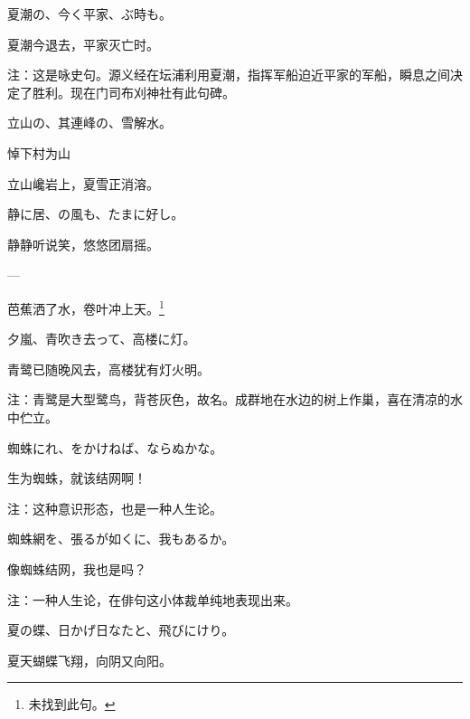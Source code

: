 \begin{haiku}
    {\FH 夏潮の、今く平家、ぶ時も。}

    {\FK 夏潮今退去，平家灭亡时。}

    {\FT 注：这是咏史句。源义经在坛浦利用夏潮，指挥军船迫近平家的军船，瞬息之间决定了胜利。现在门司布刈神社有此句碑。}
\end{haiku}

\begin{haiku}
    {\FH 立山の、其連峰の、雪解水。}

    {\FK 悼下村为山}

    {\FK 立山巉岩上，夏雪正消溶。}
\end{haiku}

\begin{haiku}
    {\FH 静に居、の風も、たまに好し。}

    {\FK 静静听说笑，悠悠团扇摇。}
\end{haiku}

\begin{haiku}
    {\FH ---}

    {\FK 芭蕉洒了水，卷叶冲上天。\footnote{\FT 未找到此句。}}
\end{haiku}

\begin{haiku}
    {\FH 夕嵐、青吹き去って、高楼に灯。}

    {\FK 青鹭已随晚风去，高楼犹有灯火明。}

    {\FT 注：青鹭是大型鹭鸟，背苍灰色，故名。成群地在水边的树上作巢，喜在清凉的水中伫立。}
\end{haiku}

\begin{haiku}
    {\FH 蜘蛛にれ、をかけねば、ならぬかな。}

    {\FK 生为蜘蛛，就该结网啊！}

    {\FT 注：这种意识形态，也是一种人生论。}
\end{haiku}

\begin{haiku}
    {\FH 蜘蛛網を、張るが如くに、我もあるか。}

    {\FK 像蜘蛛结网，我也是吗？}

    {\FT 注：一种人生论，在俳句这小体裁单纯地表现出来。}
\end{haiku}

\begin{haiku}
    {\FH 夏の蝶、日かげ日なたと、飛びにけり。}

    {\FK 夏天蝴蝶飞翔，向阴又向阳。}
\end{haiku}

